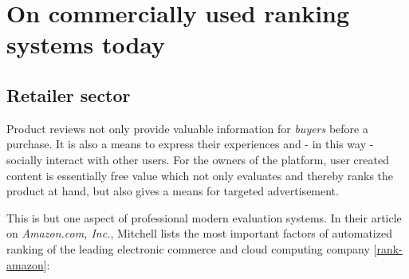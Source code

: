 
\section{On commercially used ranking systems today}

\subsection{Retailer sector} %
Product reviews not only provide valuable information for {\emph{buyers}} before a purchase.
It is also a means to express their experiences and - in this way - socially interact with other users. 
For the owners of the platform, user created content is essentially free value which not only 
evaluates and thereby ranks the product at hand, but also gives a means for targeted advertisement. 

This is but one aspect of professional modern evaluation systems.
In their article on {\emph{Amazon.com, Inc.}}, Mitchell lists the most important factors of automatized ranking of 
the leading electronic commerce and cloud computing company [\href{https://startupbros.com/rank-amazon/}{rank-amazon}]: %

{} %

